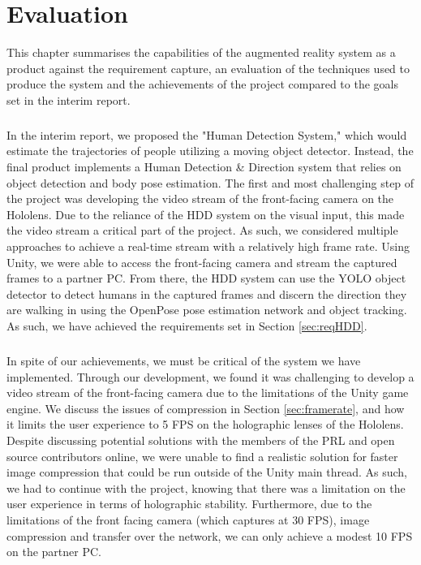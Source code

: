 \chapter{Evaluation}
This chapter summarises the capabilities of the augmented reality system as a product against the requirement capture, an evaluation of the techniques used to produce the system and the achievements of the project compared to the goals set in the interim report.

\paragraph{}In the interim report, we proposed the "Human Detection System," which would estimate the trajectories of people utilizing a moving object detector. Instead, the final product implements a Human Detection \& Direction system that relies on object detection and body pose estimation. The first and most challenging step of the project was developing the video stream of the front-facing camera on the Hololens. Due to the reliance of the HDD system on the visual input, this made the video stream a critical part of the project. As such, we considered multiple approaches to achieve a real-time stream with a relatively high frame rate. Using Unity, we were able to access the front-facing camera and stream the captured frames to a partner PC. From there, the HDD system can use the YOLO object detector to detect humans in the captured frames and discern the direction they are walking in using the OpenPose pose estimation network and object tracking.  As such, we have achieved the requirements set in Section \ref{sec:reqHDD}. 

\paragraph{}In spite of our achievements, we must be critical of the system we have implemented. Through our development, we found it was challenging to develop a video stream of the front-facing camera due to the limitations of the Unity game engine. We discuss the issues of compression in Section \ref{sec:framerate}, and how it limits the user experience to 5 FPS on the holographic lenses of the Hololens. Despite discussing potential solutions with the members of the PRL and open source contributors online, we were unable to find a realistic solution for faster image compression that could be run outside of the Unity main thread. As such, we had to continue with the project, knowing that there was a limitation on the user experience in terms of holographic stability. Furthermore, due to the limitations of the front facing camera (which captures at 30 FPS), image compression and transfer over the network, we can only achieve a modest 10 FPS on the partner PC. 

